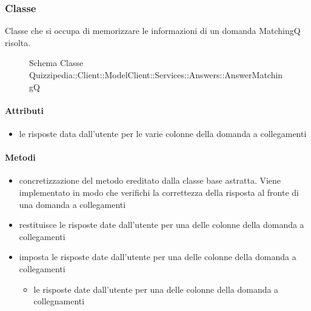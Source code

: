\subsubsection{Classe }
Classe che si occupa di memorizzare le informazioni di un domanda MatchingQ risolta.
\begin{figure}[H]
\centering
\noindent{}
\caption[Schema Classe AnswerMatchingQ]{Schema Classe Quizzipedia::Client::ModelClient::Services::Answers::AnswerMatchingQ}
\end{figure}
\paragraph{Attributi}
\begin{itemize}
\item {}
\newline
le risposte data dall'utente per le varie colonne della domanda a collegamenti
\end{itemize}
\paragraph{Metodi}
\begin{itemize}
\item {}
\newline
concretizzazione del metodo ereditato dalla classe base astratta. Viene implementato in modo che verifichi la correttezza della risposta al fronte di una domanda a collegamenti
\newline
\item {}
\newline
restituisce le risposte date dall'utente per una delle colonne della domanda a collegamenti
\newline
\item {}
\newline
imposta le risposte date dall'utente per una delle colonne della domanda a collegamenti
\newline
{}
\newline
\begin{itemize}
\item {}
\newline
le risposte date dall'utente per una delle colonne della domanda a collegnamenti
\end{itemize}
\end{itemize}
